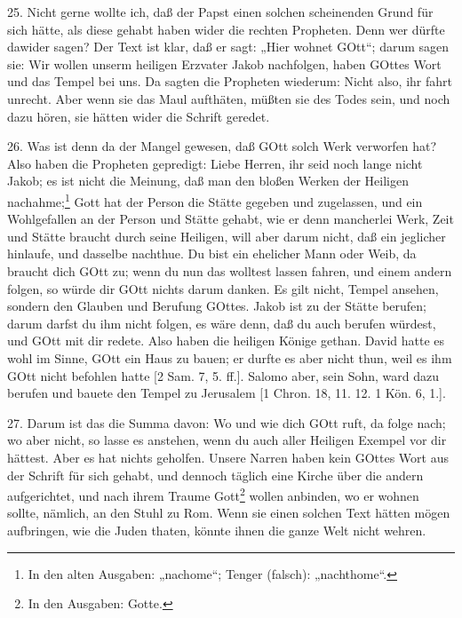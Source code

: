 25. Nicht gerne wollte ich, daß der Papst einen solchen scheinenden Grund für sich hätte, als diese gehabt haben wider die rechten Propheten. Denn wer dürfte dawider sagen? Der Text ist klar, daß er sagt: „Hier wohnet GOtt“; darum sagen sie: Wir wollen unserm heiligen Erzvater Jakob nachfolgen, haben GOttes Wort und das Tempel bei uns. Da sagten die Propheten wiederum: Nicht also, ihr fahrt unrecht. Aber wenn sie das Maul aufthäten, müßten sie des Todes sein, und noch dazu hören, sie hätten wider die Schrift geredet.

26. Was ist denn da der Mangel gewesen, daß GOtt solch Werk verworfen hat? Also haben die Propheten gepredigt: Liebe Herren, ihr seid noch lange nicht Jakob; es ist nicht die Meinung, daß man den bloßen Werken der Heiligen nachahme;\footnote{In den alten Ausgaben: „nachome“; Tenger (falsch): „nachthome“.} Gott hat der Person die Stätte gegeben und zugelassen, und ein Wohlgefallen an der Person und Stätte gehabt, wie er denn mancherlei Werk, Zeit und Stätte braucht durch seine Heiligen, will aber darum nicht, daß ein jeglicher hinlaufe, und dasselbe nachthue. Du bist ein ehelicher Mann oder Weib, da braucht dich GOtt zu; wenn du nun das wolltest lassen fahren, und einem andern folgen, so würde dir GOtt nichts darum danken. Es gilt nicht, Tempel ansehen, sondern den Glauben und Berufung GOttes. Jakob ist zu der Stätte berufen; darum darfst du ihm nicht folgen, es wäre denn, daß du auch berufen würdest, und GOtt mit dir redete. Also haben die heiligen Könige gethan. David hatte es wohl im Sinne, GOtt ein Haus zu bauen; er durfte es aber nicht thun, weil es ihm GOtt nicht befohlen hatte [2 Sam. 7, 5. ff.]. Salomo aber, sein Sohn, ward dazu berufen und bauete den Tempel zu Jerusalem [1 Chron. 18, 11. 12. 1 Kön. 6, 1.].

27. Darum ist das die Summa davon: Wo und wie dich GOtt ruft, da folge nach; wo aber nicht, so lasse es anstehen, wenn du auch aller Heiligen Exempel vor dir hättest. Aber es hat nichts geholfen. Unsere Narren haben kein GOttes Wort aus der Schrift für sich gehabt, und dennoch täglich eine Kirche über die andern aufgerichtet, und nach ihrem Traume Gott\footnote{In den Ausgaben: Gotte.} wollen anbinden, wo er wohnen sollte, nämlich, an den Stuhl zu Rom. Wenn sie einen solchen Text hätten mögen aufbringen, wie die Juden thaten, könnte ihnen die ganze Welt nicht wehren.


